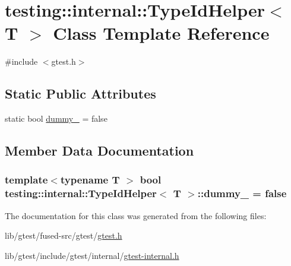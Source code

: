 \hypertarget{classtesting_1_1internal_1_1_type_id_helper}{\section{testing\-:\-:internal\-:\-:Type\-Id\-Helper$<$ T $>$ Class Template Reference}
\label{classtesting_1_1internal_1_1_type_id_helper}
}


{\ttfamily \#include $<$gtest.\-h$>$}

\subsection*{Static Public Attributes}
\begin{DoxyCompactItemize}
\item 
static bool \hyperlink{classtesting_1_1internal_1_1_type_id_helper_a372268b1520d965d0bdf01ebad3d270e}{dummy\-\_\-} = false
\end{DoxyCompactItemize}


\subsection{Member Data Documentation}
\hypertarget{classtesting_1_1internal_1_1_type_id_helper_a372268b1520d965d0bdf01ebad3d270e}{
\subsubsection[{dummy\-\_\-}]{\setlength{\rightskip}{0pt plus 5cm}template$<$typename T $>$ bool {\bf testing\-::internal\-::\-Type\-Id\-Helper}$<$ T $>$\-::dummy\-\_\- = false\hspace{0.3cm}{\ttfamily [static]}}}\label{classtesting_1_1internal_1_1_type_id_helper_a372268b1520d965d0bdf01ebad3d270e}


The documentation for this class was generated from the following files\-:\begin{DoxyCompactItemize}
\item 
lib/gtest/fused-\/src/gtest/\hyperlink{fused-src_2gtest_2gtest_8h}{gtest.\-h}\item 
lib/gtest/include/gtest/internal/\hyperlink{gtest-internal_8h}{gtest-\/internal.\-h}\end{DoxyCompactItemize}
